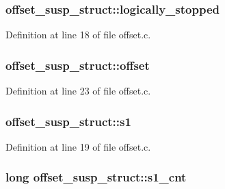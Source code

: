 \subsubsection[{\texorpdfstring{logically\+\_\+stopped}{logically_stopped}}]{ offset\+\_\+susp\+\_\+struct\+::logically\+\_\+stopped}\hypertarget{structoffset__susp__struct_a42dbf617bae6081917f4a8f2d10d899c}{}\label{structoffset__susp__struct_a42dbf617bae6081917f4a8f2d10d899c}


Definition at line 18 of file offset.\+c.

\subsubsection[{\texorpdfstring{offset}{offset}}]{ offset\+\_\+susp\+\_\+struct\+::offset}\hypertarget{structoffset__susp__struct_a1aa87eef9adf865ebc43c1af631ff2c8}{}\label{structoffset__susp__struct_a1aa87eef9adf865ebc43c1af631ff2c8}


Definition at line 23 of file offset.\+c.

\subsubsection[{\texorpdfstring{s1}{s1}}]{ offset\+\_\+susp\+\_\+struct\+::s1}\hypertarget{structoffset__susp__struct_a32f97b0f40afd4edb1afbee57b662521}{}\label{structoffset__susp__struct_a32f97b0f40afd4edb1afbee57b662521}


Definition at line 19 of file offset.\+c.

\subsubsection[{\texorpdfstring{s1\+\_\+cnt}{s1_cnt}}]{\setlength{\rightskip}{0pt plus 5cm}long offset\+\_\+susp\+\_\+struct\+::s1\+\_\+cnt}\hypertarget{structoffset__susp__struct_a173acd8c68e76f13a3e0252c620ce9d0}{}\label{structoffset__susp__struct_a173acd8c68e76f13a3e0252c620ce9d0}


